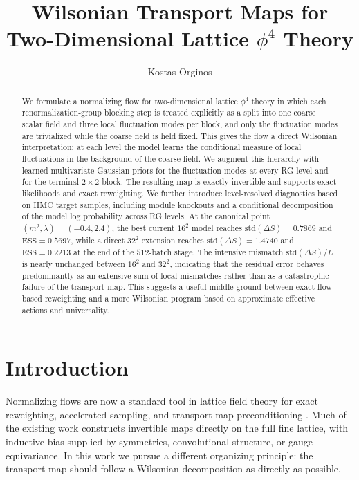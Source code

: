 \documentclass[aps,prd,preprint,nofootinbib,superscriptaddress,longbibliography]{revtex4-2}
\newcommand{\std}{\mathrm{std}}
\newcommand{\ESS}{\mathrm{ESS}}
\begin{document}
\title{Wilsonian Transport Maps for Two-Dimensional Lattice $\phi^4$ Theory}

\author{Kostas Orginos}

\begin{abstract}
We formulate a normalizing flow for two-dimensional lattice $\phi^4$ theory in
which each renormalization-group blocking step is treated explicitly as a split
into one coarse scalar field and three local fluctuation modes per block, and
only the fluctuation modes are trivialized while the coarse field is held fixed.
This gives the flow a direct Wilsonian interpretation: at each level the model
learns the conditional measure of local fluctuations in the background of the
coarse field. We augment this hierarchy with learned multivariate Gaussian
priors for the fluctuation modes at every RG level and for the terminal
$2\times2$ block. The resulting map is exactly invertible and supports exact
likelihoods and exact reweighting. We further introduce level-resolved
diagnostics based on HMC target samples, including module knockouts and a
conditional decomposition of the model log probability across RG levels. At the
canonical point $(m^2,\lambda)=(-0.4,2.4)$, the best current $16^2$ model
reaches $\std(\Delta S)=0.7869$ and $\ESS=0.5697$, while a direct $32^2$
extension reaches $\std(\Delta S)=1.4740$ and $\ESS=0.2213$ at the end of the
$512$-batch stage. The intensive mismatch $\std(\Delta S)/L$ is nearly
unchanged between $16^2$ and $32^2$, indicating that the residual error behaves
predominantly as an extensive sum of local mismatches rather than as a
catastrophic failure of the transport map. This suggests a useful middle ground
between exact flow-based reweighting and a more Wilsonian program based on
approximate effective actions and universality.
\end{abstract}

\maketitle

\section{Introduction}

Normalizing flows are now a standard tool in lattice field theory for exact
reweighting, accelerated sampling, and transport-map preconditioning
\cite{Dinh2017RealNVP,Albergo2019FlowMCMC,Kanwar2020Equivariant,Albergo2021FlowScaling}.
Much of the existing work constructs invertible maps directly on the full fine
lattice, with inductive bias supplied by symmetries, convolutional structure, or
gauge equivariance. In this work we pursue a different organizing principle: the
transport map should follow a Wilsonian decomposition as directly as possible.
\end{document}
